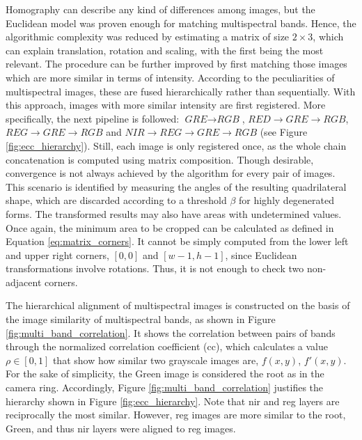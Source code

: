 Homography can describe any kind of differences among images, but the Euclidean model was proven enough for matching multispectral bands. Hence, the algorithmic complexity was reduced by estimating a matrix of size $2 \times 3$, which can explain translation, rotation and scaling, with the first being the most relevant. The procedure can be further improved by first matching those images which are more similar in terms of intensity. According to the peculiarities of multispectral images, these are fused hierarchically rather than sequentially. With this approach, images with more similar intensity are first registered. More specifically, the next pipeline is followed: $\textit{GRE} \rightarrow \textit{RGB}$, $\textit{RED} \rightarrow \textit{GRE} \rightarrow \textit{RGB}$, $\textit{REG} \rightarrow \textit{GRE} \rightarrow \textit{RGB}$ and $\textit{NIR} \rightarrow \textit{REG} \rightarrow \textit{GRE} \rightarrow \textit{RGB}$ (see Figure \ref{fig:ecc_hierarchy}). Still, each image is only registered once, as the whole chain concatenation is computed using matrix composition. Though desirable, convergence is not always achieved by the algorithm for every pair of images. This scenario is identified by measuring the angles of the resulting quadrilateral shape, which are discarded according to a threshold $\beta$ for highly degenerated forms. The transformed results may also have areas with undetermined values. Once again, the minimum area to be cropped can be calculated as defined in Equation \ref{eq:matrix_corners}. It cannot be simply computed from the lower left and upper right corners, $[0, 0]$ and $[w - 1, h - 1]$, since Euclidean transformations involve rotations. Thus, it is not enough to check two non-adjacent corners.

The hierarchical alignment of multispectral images is constructed on the basis of the image similarity of multispectral bands, as shown in Figure \ref{fig:multi_band_correlation}. It shows the correlation between pairs of bands through the normalized correlation coefficient (\acrshort{cc}), which calculates a value $\rho \in [0,1]$ that show how similar two grayscale images are, $f(x, y)$, $f'(x, y)$. For the sake of simplicity, the Green image is considered the root as in the camera ring. Accordingly, Figure \ref{fig:multi_band_correlation} justifies the hierarchy shown in Figure \ref{fig:ecc_hierarchy}. Note that \acrshort{nir} and \acrshort{reg} layers are reciprocally the most similar. However, \acrshort{reg} images are more similar to the root, Green, and thus \acrshort{nir} layers were aligned to \acrfull{reg} images.

